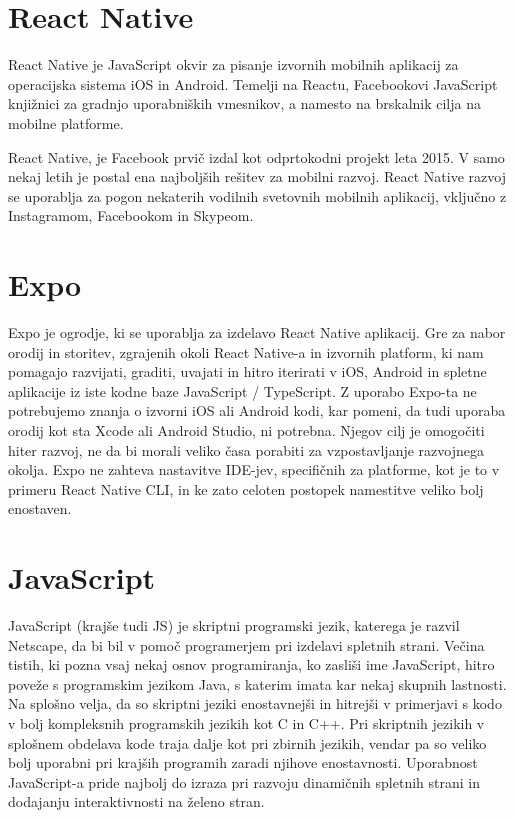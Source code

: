 \documentclass[a4paper, 12pt]{book}
\begin{document}
\section{React Native}
React Native je JavaScript okvir za pisanje izvornih mobilnih aplikacij za operacijska sistema iOS in Android. Temelji na Reactu, Facebookovi JavaScript knjižnici za gradnjo uporabniških vmesnikov, a namesto na brskalnik cilja na mobilne platforme. 

React Native, je Facebook prvič izdal kot odprtokodni projekt leta 2015. V samo nekaj letih je postal ena najboljših rešitev za mobilni razvoj. React Native razvoj se uporablja za pogon nekaterih vodilnih svetovnih mobilnih aplikacij, vključno z Instagramom, Facebookom in Skypeom.~\cite{RN}

\section{Expo}
Expo je ogrodje, ki se uporablja za izdelavo React Native aplikacij. Gre za nabor orodij in storitev, zgrajenih okoli React Native-a in izvornih platform, ki nam pomagajo razvijati, graditi, uvajati in hitro iterirati v iOS, Android in spletne aplikacije iz iste kodne baze JavaScript / TypeScript. Z uporabo Expo-ta ne potrebujemo znanja o izvorni iOS ali Android kodi, kar pomeni, da tudi uporaba orodij kot sta Xcode ali Android Studio, ni potrebna. Njegov cilj je omogočiti hiter razvoj, ne da bi morali veliko časa porabiti za vzpostavljanje razvojnega okolja. Expo ne zahteva nastavitve IDE-jev, specifičnih za platforme, kot je to v primeru React Native CLI, in ke zato celoten postopek namestitve veliko bolj enostaven.~\cite{EXPO}

\section{JavaScript}
JavaScript (krajše tudi JS) je skriptni programski jezik, katerega je razvil Netscape, da bi bil v pomoč programerjem pri izdelavi spletnih strani. Večina tistih, ki pozna vsaj nekaj osnov programiranja, ko zasliši ime JavaScript, hitro poveže s programskim jezikom Java, s katerim imata kar nekaj skupnih lastnosti. Na splošno velja, da so skriptni jeziki enostavnejši in hitrejši v primerjavi s kodo v bolj kompleksnih programskih jezikih kot C in C++. Pri skriptnih jezikih v splošnem obdelava kode traja dalje kot pri zbirnih jezikih, vendar pa so veliko bolj uporabni pri krajših programih zaradi njihove enostavnosti. Uporabnost JavaScript-a pride najbolj do izraza pri razvoju dinamičnih spletnih strani in dodajanju interaktivnosti na želeno stran.
\end{document}
